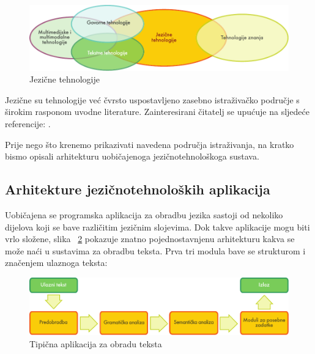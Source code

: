 \begin{multicols}{2}
\begin{figure}[htb]
  \center
  \includegraphics[width=\textwidth]{../_media/croatian/language_technologies}
  \caption{Jezične tehnologije}
  \label{fig:ltincontext_cro}
\end{figure}

Jezične su tehnologije već čvrsto uspostavljeno zasebno istraživačko područje s širokim rasponom uvodne literature. Zainteresirani čitatelj se upućuje na sljedeće referencije: \cite{pro12, boo7, boo8, str37, boo9}.

Prije nego što krenemo prikazivati navedena područja istraživanja, na kratko bismo opisali arhitekturu uobičajenoga jezičnotehnološkoga sustava.


\subsection{Arhitekture jezičnotehnoloških aplikacija}

Uobičajena se programska aplikacija za obradbu jezika sastoji od nekoliko dijelova koji se bave različitim jezičnim slojevima. Dok takve aplikacije mogu biti vrlo složene, slika ~\ref{fig:textprocessingarch_cro} pokazuje znatno pojednostavnjenu arhitekturu kakva se može naći u sustavima za obradbu teksta. Prva tri modula bave se strukturom i značenjem ulaznoga teksta:

\begin{figure}[b]
  \center
  \includegraphics[width=\textwidth]{../_media/croatian/text_processing_app_architecture}
  \caption{Tipična aplikacija za obradu teksta}
  \label{fig:textprocessingarch_cro}
\end{figure}


\end{multicols}
